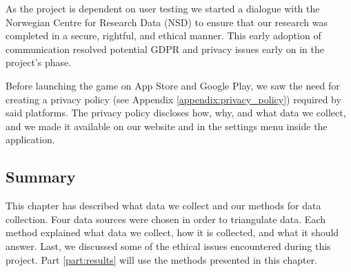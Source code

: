 As the project is dependent on user testing we started a dialogue with the Norwegian Centre for Research Data (NSD) to ensure that our research was completed in a secure, rightful, and ethical manner. This early adoption of communication resolved potential GDPR and privacy issues early on in the project’s phase.

Before launching the game on App Store and Google Play, we saw the need for creating a privacy policy (see Appendix \ref{appendix:privacy_policy}) required by said platforms. The privacy policy discloses how, why, and what data we collect, and we made it available on our website and in the settings menu inside the application.

\subsection{Summary}
This chapter has described what data we collect and our methods for data collection. Four data sources were chosen in order to triangulate data. Each method explained what data we collect, how it is collected, and what it should answer. Last, we discussed some of the ethical issues encountered during this project. Part \ref{part:results} will use the methods presented in this chapter.
